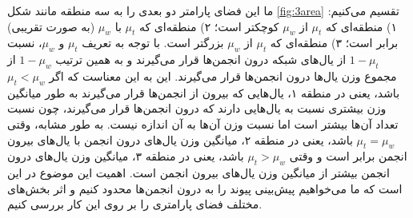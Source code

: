 ما این فضای پارامتر دو بعدی را به سه منطقه مانند شکل \ref{fig:3area} تقسیم می‌کنیم: ۱) منطقه‌ای که $\mu_t$ از $\mu_w$ کوچکتر است؛ ۲) منطقه‌ای که $\mu_t$ با $\mu_w$ (به صورت تقریبی) برابر است؛ ۳) منطقه‌ای که $\mu_t$ از $\mu_w$ بزرگتر است. با توجه به تعریف $\mu_t$ و $\mu_w$، نسبت
$1-\mu_t$ از یال‌های شبکه درون انجمن‌ها قرار می‌گیرند و به همین ترتیب
$1-\mu_w$ از مجموع وزن یال‌ها درون انجمن‌ها قرار می‌گیرند.
این به این معناست که اگر
$\mu_t<\mu_w$ باشد، یعنی در منطقه ۱، یال‌هایی که بیرون از انجمن‌ها قرار می‌گیرند به طور میانگین وزن بیشتری نسبت به یال‌هایی دارند که درون انجمن‌ها قرار می‌گیرند، چون نسبت تعداد آن‌ها بیشتر است اما نسبت وزن آن‌ها به آن اندازه نیست. به طور مشابه، وقتی
$\mu_t=\mu_w$ باشد، یعنی در منطقه ۲، میانگین وزن یال‌های درون انجمن با یال‌های بیرون انجمن برابر است و وقتی
$\mu_t>\mu_w$ باشد، یعنی در منطقه ۳، میانگین وزن یال‌های درون انجمن بیشتر از میانگین وزن یال‌های بیرون انجمن است.
اهمیت این موضوع در این است که ما می‌خواهیم پیش‌بینی پیوند را به درون انجمن‌ها محدود کنیم و اثر بخش‌های مختلف فضای پارامتری را بر روی این کار بررسی کنیم.


